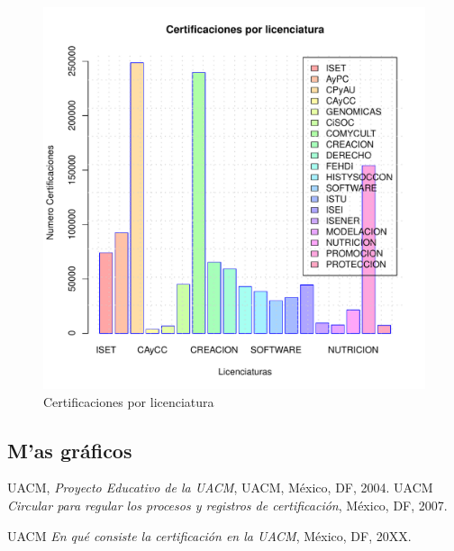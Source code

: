 \documentclass[12pt]{article}
\begin{document}
\begin{figure}
\centering
\includegraphics[scale=0.45]{Graficas/BarPlotLic.pdf}
\caption{Certificaciones por licenciatura}
\label{Fig.Cert.Lic}
\end{figure}


\subsection{M'as gr\'aficos}




\begin{thebibliography}{20}
 \textsc{UACM},
\textit{Proyecto Educativo de la UACM},
UACM, M\'exico, DF, 2004.
 \textsc{UACM} 
\textit{Circular para regular los procesos y registros de certificaci\'on}, M\'exico, DF, 2007.

 \textsc{UACM} 
\textit{En qu\'e consiste la certificaci\'on en la UACM}, M\'exico, DF, 20XX.


\end{thebibliography}
\end{document}
